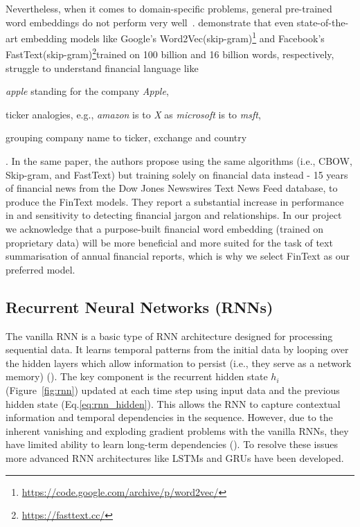 Nevertheless, when it comes to domain-specific problems, general pre-trained word embeddings do not perform very well~\cite{rahimikia2021realised}.
demonstrate that even state-of-the-art embedding models like Google's Word2Vec(skip-gram)\footnote{\url{https://code.google.com/archive/p/word2vec/}} and Facebook’s FastText(skip-gram)\footnote{\url{https://fasttext.cc/}}trained on 100 billion and 16 billion words, respectively, struggle to understand financial language like \begin{enumerate*}
    \item \emph{apple} standing for the company \emph{Apple},
    \item ticker analogies, e.g., \emph{amazon} is to \emph{X} as \emph{microsoft} is to \emph{msft},
    \item grouping company name to ticker, exchange and country
\end{enumerate*}.
In the same paper, the authors propose using the same algorithms (i.e., CBOW, Skip-gram, and FastText) but training solely on financial data instead - 15 years of financial news from the Dow Jones Newswires Text News Feed database, to produce the FinText models.
They report a substantial increase in performance in and sensitivity to detecting financial jargon and relationships.
In our project we acknowledge that a purpose-built financial word embedding (trained on proprietary data) will be more beneficial and more suited for the task of text summarisation of annual financial reports, which is why we select FinText as our preferred model.

\subsection{Recurrent Neural Networks (RNNs)}\label{subsec:rnn}
The vanilla RNN is a basic type of RNN architecture designed for processing sequential data.
It learns temporal patterns from the initial data by looping over the hidden layers which allow information to persist (i.e., they serve as a network memory) (\cite{olah2015understandingLSTM}).
The key component is the recurrent hidden state $h_i$ (Figure~\ref{fig:rnn}) updated at each time step using input data and the previous hidden state (Eq.\ref{eq:rnn_hidden}).
This allows the RNN to capture contextual information and temporal dependencies in the sequence.
However, due to the inherent vanishing and exploding gradient problems with the vanilla RNNs, they have limited ability to learn long-term dependencies (\cite{bengio1994learning}).
To resolve these issues more advanced RNN architectures like LSTMs and GRUs have been developed.

